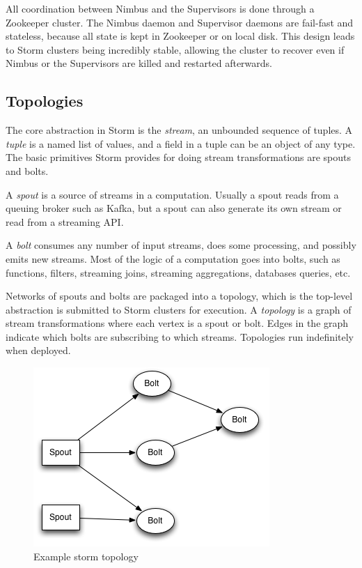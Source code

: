 All coordination between Nimbus and the Supervisors is done through a Zookeeper cluster. The Nimbus daemon and Supervisor daemons are fail-fast and stateless, because all state is kept in Zookeeper or on local disk. This design leads to Storm clusters being incredibly stable, allowing the cluster to recover even if Nimbus or the Supervisors are killed and restarted afterwards.

\subsection{Topologies}

The core abstraction in Storm is the \emph{stream}, an unbounded sequence of tuples. A \emph{tuple} is a named list of values, and a field in a tuple can be an object of any type. The basic primitives Storm provides for doing stream transformations are spouts and bolts.

A \emph{spout} is a source of streams in a computation. Usually a spout reads from a queuing broker such as Kafka, but a spout can also generate its own stream or read from a streaming API.

A \emph{bolt} consumes any number of input streams, does some processing, and possibly emits new streams. Most of the logic of a computation goes into bolts, such as functions, filters, streaming joins, streaming aggregations, databases queries, etc.

Networks of spouts and bolts are packaged into a topology, which is the top-level abstraction is submitted to Storm clusters for execution. A \emph{topology} is a graph of stream transformations where each vertex is a spout or bolt. Edges in the graph indicate which bolts are subscribing to which streams. Topologies run indefinitely when deployed.

\begin{figure}[H]
\centering
\includegraphics{figures/storm_topology}
\caption{Example storm topology}
\label{figure:storm_topology}
\end{figure}

